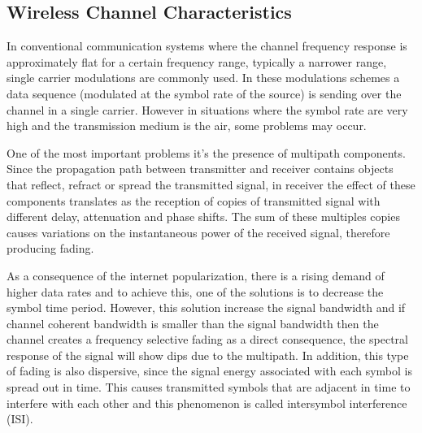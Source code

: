 \subsection{Wireless Channel Characteristics}

\par In conventional communication systems where the channel frequency response is approximately flat for a certain frequency range, typically a narrower range, single carrier modulations are commonly used. In these modulations schemes a data sequence (modulated at the symbol rate of the source) is sending over the channel in a single carrier. However in situations where the symbol rate are very high and the transmission medium is the air, some problems may occur.

\par One of the most important problems it's the presence of multipath components. Since the propagation path between transmitter and receiver contains objects that reflect, refract or spread the transmitted signal, in receiver the effect of these components translates as the reception of copies of transmitted signal with different delay, attenuation and phase shifts. The sum of these multiples copies causes variations on the instantaneous power of the received signal, therefore producing fading.

\par As a consequence of the internet popularization, there is a rising demand of higher data rates and to achieve this, one of the solutions is to decrease the symbol time period. However, this solution increase the signal bandwidth and if channel coherent bandwidth is smaller than the signal bandwidth then the channel creates a frequency selective fading as a direct consequence, the spectral response of the signal will show dips due to the multipath. In addition, this type of fading is also dispersive, since the signal energy associated with each symbol is spread out in time. This causes transmitted symbols that are adjacent in time to interfere with each other and this phenomenon is called intersymbol interference (ISI).
